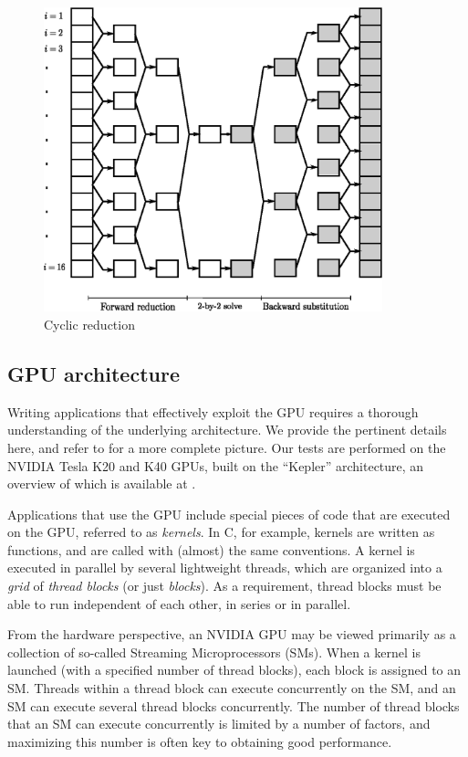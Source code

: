 \documentclass{elsarticle}
\begin{document}
\begin{figure}[h!]
\begin{center}
\includegraphics[height=250pt]{img/cyclic-reduction.eps}
\end{center}
\caption{Cyclic reduction}
\label{fig:cyclic-reduction}
\end{figure}

\subsection{GPU architecture} \label{subsec:gpu-architecture}

Writing applications that effectively exploit the GPU
requires a thorough understanding of the underlying architecture.
We provide the pertinent details here,
and refer to \cite{GPUcomputingera} for a more complete picture.
Our tests are performed on the NVIDIA Tesla K20 and K40 GPUs,
built on the ``Kepler'' architecture,
an overview of which is available at \cite{Keplerwhitepaper}.

Applications that use the GPU include special
pieces of code that are executed on the GPU,
referred to as \emph{kernels}.
In C, for example, kernels are written as functions,
and are called with (almost) the same conventions.
A kernel is executed in parallel by several lightweight threads,
which are organized into a \emph{grid} of \emph{thread blocks}
(or just \emph{blocks}).
As a requirement, thread blocks must be able to run
independent of each other,
in series or in parallel.

From the hardware perspective, an NVIDIA GPU may be viewed primarily as
a collection of so-called Streaming Microprocessors (SMs).
When a kernel is launched (with a specified number of thread blocks),
each block is assigned to an SM.
Threads within a thread block can execute concurrently on the SM,
and an SM can execute several thread blocks concurrently.
The number of thread blocks that an SM can execute concurrently
is limited by a number of factors,
and maximizing this number is often key to obtaining good performance.
\end{document}
